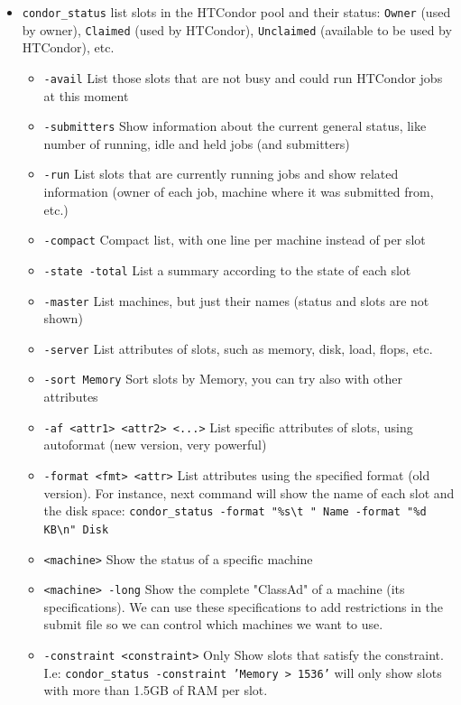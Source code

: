 \documentclass[a4paper,10pt]{article}
\begin{document}
\begin{itemize}
\item \texttt{condor\_status} list slots in the HTCondor pool and their status: \texttt{Owner} (used
by owner), \texttt{Claimed} (used by HTCondor), \texttt{Unclaimed} (available to be used
by HTCondor), etc. 
\begin{itemize}
\item \texttt{-avail} List those slots that are not busy and could run HTCondor jobs at
this moment
\item \texttt{-submitters} Show information about the current general status, like
number of running, idle and held jobs (and submitters)
\item \texttt{-run} List slots that are currently running jobs and show related
information (owner of each job, machine where it was submitted from, etc.)
\item \texttt{-compact} Compact list, with one line per machine instead of per slot
\item \texttt{-state -total} List a summary according to the state of each slot
\item \texttt{-master} List machines, but just their names (status and slots are not
shown)
\item \texttt{-server} List attributes of slots, such as memory, disk, load, flops, etc.
\item \texttt{-sort Memory} Sort slots by Memory, you can try also with other attributes
\item \texttt{-af <attr1> <attr2> <...>} List specific attributes of slots, using
autoformat (new version, very powerful)
\item \texttt{-format <fmt> <attr>} List attributes using the specified format (old
version). For instance, next command will show the name of each slot and the
disk space: \texttt{condor\_status -format "\%s\textbackslash{}t " Name -format "\%d KB\textbackslash{}n" Disk}
\item \texttt{<machine>} Show the status of a specific machine
\item \texttt{<machine> -long} Show the complete "ClassAd" of a machine (its
specifications). We can use these specifications to add restrictions in the
submit file so we can control which machines we want to use.
\item \texttt{-constraint <constraint>} Only Show slots that satisfy the
constraint. I.e: \texttt{condor\_status -constraint 'Memory > 1536'} will only show
slots with more than 1.5GB of RAM per slot.
\end{itemize}
\end{itemize}
\end{document}
